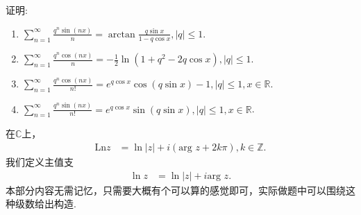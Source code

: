\documentclass[../../main.tex]{subfiles}%
\begin{document}
\begin{proposition}\label{proposition:常用级数公式1}
证明:
\begin{enumerate}[(1)]
\item \(\sum_{n = 1}^{\infty} \frac{q^{n} \sin(nx)}{n}= \arctan \frac{q \sin x}{1 - q \cos x}, |q| \leqslant 1\).

\item \(\sum_{n = 1}^{\infty} \frac{q^{n} \cos(nx)}{n}= -\frac{1}{2} \ln(1 + q^{2} - 2q \cos x), |q| \leqslant 1\).

\item \(\sum_{n = 1}^{\infty} \frac{q^{n} \cos(nx)}{n!}= e^{q \cos x} \cos(q \sin x) - 1, |q| \leqslant 1, x \in \mathbb{R}\).

\item \(\sum_{n = 1}^{\infty} \frac{q^{n} \sin(nx)}{n!}= e^{q \cos x} \sin(q \sin x), |q| \leqslant 1, x \in \mathbb{R}\).
\end{enumerate}
\end{proposition}
\begin{note}
在\(\mathbb{C}\)上，
\begin{align*}
\text{Ln}z &= \ln|z| + i(\text{arg }z + 2k\pi), k \in \mathbb{Z}.  
\end{align*}
我们定义主值支
\begin{align*}
\ln z &= \ln|z| + i\text{arg }z. 
\end{align*}
本部分内容无需记忆，只需要大概有个可以算的感觉即可，实际做题中可以围绕这种级数给出构造.
\end{note}
\end{document}
